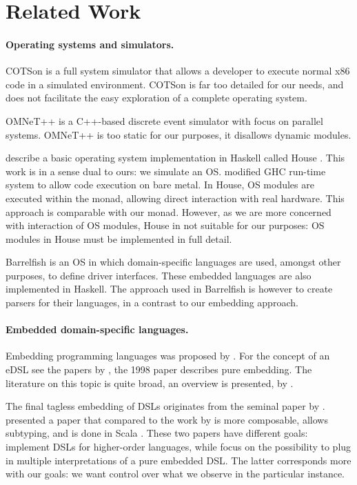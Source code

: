 \section{Related Work}
\label{sec:related-work}

\paragraph{Operating systems and simulators.}
COTSon \cite{cotson} is a full system simulator that allows a developer to execute normal x86 code in a simulated environment.
COTSon is far too detailed for our needs, and does not facilitate the easy exploration of a complete operating system.

OMNeT++ \cite{omnet} is a C++-based discrete event simulator with focus on parallel systems. OMNeT++ is too static for our purposes, it disallows dynamic modules.


\citeauthor{house} describe a basic operating system implementation in Haskell called House \cite{house}.
This work is in a sense dual to ours: we simulate an OS.
\citeauthor{house} modified GHC run-time system to allow code execution on bare metal.
In House, OS modules are executed within the  monad, allowing direct interaction with real hardware.
This approach is comparable with our  monad.
However, as we are more concerned with interaction of OS modules, House in not suitable for our purposes:  OS modules in House must be implemented in full detail.

Barrelfish \cite{barrelfish} is an OS in which domain-specific languages are used, amongst other purposes, to define driver interfaces.
These embedded languages are also implemented in Haskell.
The approach used in Barrelfish is however to create parsers for their languages, in a contrast to our embedding approach.


\paragraph{Embedded domain-specific languages.}
Embedding programming languages was proposed by \citeauthor{Landin:1966:NPL:365230.365257} \cite{Landin:1966:NPL:365230.365257}.
For the concept of an eDSL see the papers by \citeauthor{hudak1} \cite{hudak1,hudak2}, the 1998 paper describes pure embedding.
The literature on this topic is quite broad, an overview is presented, \eg by \citeauthor{dsl-survey} \cite{dsl-survey}.

The final tagless embedding of DSLs originates from the seminal paper by \citeauthor{final_tagless_embedding} \cite{final_tagless_embedding}.
\citeauthor{Hofer:2008:PED:1449913.1449935} \cite{Hofer:2008:PED:1449913.1449935} presented a paper that compared to the work by \citeauthor{final_tagless_embedding} \cite{final_tagless_embedding} is more composable, allows subtyping, and is done in Scala \cite{odersky2008programming}.
These two papers have different goals: \citeauthor{final_tagless_embedding} implement DSLs for higher-order languages, while \citeauthor{Hofer:2008:PED:1449913.1449935} focus on the possibility to plug in multiple interpretations of a pure embedded DSL.
The latter corresponds more with our goals: we want control over what we observe in the particular instance.

